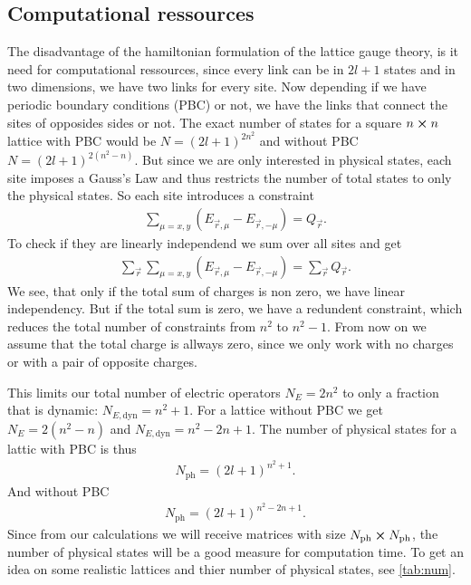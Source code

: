 \subsection{Computational ressources}
The disadvantage of the hamiltonian formulation of the lattice gauge theory, is it need for computational ressources, since every link can be in $2l+1$ states and in two dimensions, we have two links for every site. Now depending if we have periodic boundary conditions (PBC) or not, we have the links that connect the sites of opposides sides or not.
The exact number of states for a square $n \cross n$ lattice with PBC would be $N=(2l+1)^{2n^2}$ and without PBC $N=(2l+1)^{2(n^2-n)}$. But since we are only interested in physical states, each site imposes a Gauss's Law and thus restricts the number of total states to only the physical states. So each site introduces a constraint
\begin{align}
	\sum_{\mu=x,y}\left(E_{\vec{r}, \mu} - E_{\vec{r}, -\mu}\right) = Q_{\vec{r}}.
\end{align}
To check if they are linearly independend we sum over all sites and get
\begin{align}
	\sum_{\vec{r}}\sum_{\mu=x,y}\left(E_{\vec{r}, \mu} - E_{\vec{r}, -\mu}\right) = \sum_{\vec{r}}Q_{\vec{r}}.
\end{align}
We see, that only if the total sum of charges is non zero, we have linear independency. But if the total sum is zero, we have a redundent constraint, which reduces the total number of constraints from $n^2$ to $n^2 -1$. From now on we assume that the total charge is allways zero, since we only work with no charges or with a pair of opposite charges.

This limits our total number of electric operators $N_{E}=2n^2$ to only a fraction that is dynamic: $N_{E,\text{dyn}} = n^2+1$. For a lattice without PBC we get $N_{E}=2(n^2-n)$ and $N_{E,\text{dyn}} = n^2-2n+1$.
The number of physical states for a lattic with PBC is thus
\begin{align}
	N_{\text{ph}}=(2l+1)^{n^2+1}.
\end{align}
And without PBC
\begin{align}
	N_{\text{ph}}=(2l+1)^{n^2-2n+1}.
\end{align}
Since from our calculations we will receive matrices with size $N_{\text{ph}} \cross N_{\text{ph}}$, the number of physical states will be a good measure for computation time.
To get an idea on some realistic lattices and thier number of physical states, see \cref{tab:num}.


